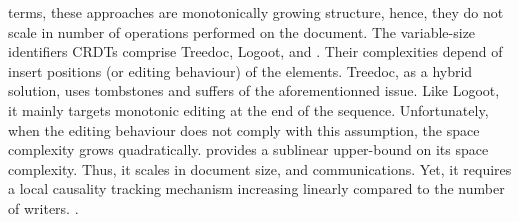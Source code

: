 \begin{asparadesc}
  terms, these approaches are monotonically growing structure, hence, they do
  not scale in number of operations performed on the document. The variable-size
  identifiers CRDTs comprise Treedoc, Logoot, and \LSEQ. Their complexities
  depend of insert positions (or editing behaviour) of the elements. Treedoc, as
  a hybrid solution, uses tombstones and suffers of the aforementionned
  issue. Like Logoot, it mainly targets monotonic editing at the end of the
  sequence. Unfortunately, when the editing behaviour does not comply with this
  assumption, the space complexity grows quadratically. \LSEQ provides a
  sublinear upper-bound on its space complexity. Thus, it scales in document
  size, and communications. Yet, it requires a local causality tracking
  mechanism increasing linearly compared to the number of
  writers. .
\end{asparadesc}

